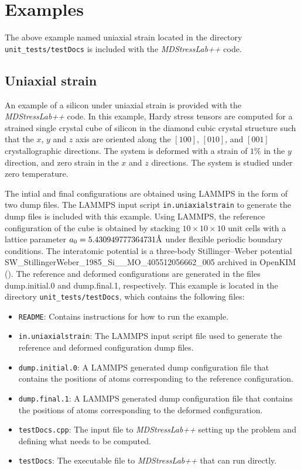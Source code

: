 \documentclass[authoryear]{elsarticle}
\newcommand{\ttt}{\texttt}
\newcommand{\MDStressLab}{\emph{MDStressLab++}\xspace}
\newcommand{\angstrom}{\textup{\AA}}
\begin{document}
\section{Examples}
The above example named uniaxial strain located in the directory \ttt{unit\_tests/testDocs} is included with the \MDStressLab code.
\subsection{Uniaxial strain}

An example of a silicon under uniaxial
strain is provided with the \MDStressLab code.
In this example, Hardy stress tensors are computed for a strained single crystal
cube of silicon in the diamond cubic crystal structure such that the $x$, $y$
and $z$ axis are oriented along the $[1 0 0]$, $[0 1 0]$, and $[0 0 1]$
crystallographic directions.
The system is deformed with a strain of $1\%$ in the $y$ direction, and zero strain in the
$x$ and $z$ directions. The system is studied under zero temperature.

The intial and final configurations are obtained using LAMMPS
\citep{plimpton1995} in the form of two dump files. The LAMMPS input script
\ttt{in.uniaxialstrain} to generate the dump files is included with this example.
Using LAMMPS, the reference configuration
of the cube is obtained by stacking $10\times 10\times 10$ unit cells with a
lattice parameter $a_0=5.430949777364731\angstrom$ under flexible periodic boundary conditions.
The interatomic potential is a three-body Stillinger--Weber potential SW\_StillingerWeber\_1985\_Si\_\_MO\_405512056662\_005 archived in
OpenKIM (\cite{MO_405512056662_005,MD_335816936951_004,elliott:tadmor:2011}).
The reference and
deformed configurations are generated in the files dump.initial.0 and
dump.final.1, respectively. This example is
located in the directory \ttt{unit\_tests/testDocs}, which contains the
following files:

\begin{itemize}
\item \ttt{README}: Contains instructions for how to run the example.
\item \ttt{in.uniaxialstrain}: The LAMMPS input script file used to generate
                                the reference and deformed configuration dump files.
\item \ttt{dump.initial.0}: A LAMMPS generated dump configuration file that contains
                         the positions of atoms corresponding to the
                          reference configuration.
\item \ttt{dump.final.1}: A LAMMPS generated dump configuration file that contains the
                           positions of atoms corresponding to the deformed
                           configuration.
\item \ttt{testDocs.cpp}: The input file to \MDStressLab setting up the problem and
                        defining what needs to be computed.
\item \ttt{testDocs}: The executable file to \MDStressLab that can run directly.
\end{itemize}
\end{document}
